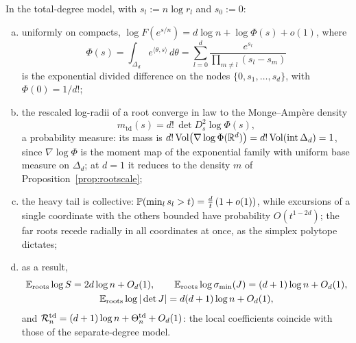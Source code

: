 \begin{proposition}\label{prop:totaldegree}
  In the total-degree model, with $s_l := n\log r_l$ and $s_0 := 0$:
  \begin{enumerate}[(a)]
    \item uniformly on compacts, $\log F(e^{s/n}) = d\log n + \log\Phi(s) + o(1)$, where
      \[
        \Phi(s) = \int_{\Delta_d}e^{\langle\theta,s\rangle}\,d\theta
        = \sum_{l=0}^d\frac{e^{s_l}}{\prod_{m\ne l}(s_l-s_m)}
      \]
      is the exponential divided difference on the nodes $\{0,s_1,\dots,s_d\}$, with
      $\Phi(0) = 1/d!$;
    \item the rescaled log-radii of a root converge in law to the Monge--Amp\`ere density
      \[
        m_{\mathrm{td}}(s) = d!\,\det D_s^2\log\Phi(s),
      \]
      a probability measure: its mass is
      $d!\Vol\bigl(\nabla\log\Phi(\R^d)\bigr) = d!\Vol(\mathrm{int}\,\Delta_d) = 1$,
      since $\nabla\log\Phi$ is the moment map of the exponential family with uniform
      base measure on $\Delta_d$; at $d=1$ it reduces to the density $m$ of
      Proposition~\ref{prop:rootscale};
    \item the heavy tail is collective: $\P(\min_ls_l>t) = \frac dt\,(1+o(1))$, while
      excursions of a single coordinate with the others bounded have probability
      $O(t^{1-2d})$; the far roots recede radially in all coordinates at once, as the
      simplex polytope dictates;
    \item as a result,
      \begin{gather*}
        \Eroots\log S = 2d\log n + O_d(1), \qquad
        \Eroots\log\sigma_{\min}(J) = (d+1)\log n + O_d(1), \\
        \Eroots\log|\det J| = d(d+1)\log n + O_d(1),
      \end{gather*}
      and $\Rcal_n^{\mathrm{td}} = (d+1)\log n + \Theta_n^{\mathrm{td}} + O_d(1)$: the
      local coefficients coincide with those of the separate-degree model.
  \end{enumerate}
\end{proposition}

